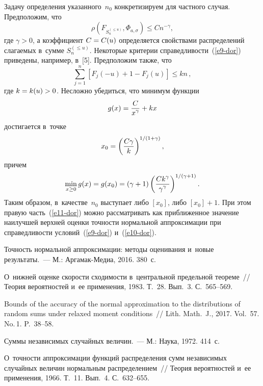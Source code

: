 \begin{multicols}{2}
Задачу определения указанного~$n_0$ конкретизируем для частного случая. Предположим, что
\begin{equation}
\rho\left(F_{S_n^{(\le u)}},\Phi_{a,\sigma}\right)\le C n^{-\gamma}, \label{e9-dor}
\end{equation}
где $\gamma>0$, а коэффициент $C\hm=C(u)$ определяется свойствами распределений слагаемых 
в~сумме $S_n^{(\le u)}$. Некоторые критерии справедливости~(\ref{e9-dor}) 
приведены, например, в~[5]. Предположим также, что
\begin{equation}
\sum\limits_{j=1}^n\left[F_j(-u)+1-F_j(u)\right]\le kn\,,
\label{e10-dor}\end{equation}
где $k=k(u)\hm>0$. Несложно убедиться, что минимум функции
$$
g(x)=\displaystyle\frac{\displaystyle C\mathstrut}{\displaystyle x^{\gamma}\mathstrut}+kx
$$
достигается в~точке
$$
x_0=\left(\displaystyle\frac{\displaystyle C\gamma\mathstrut}{\displaystyle k\mathstrut}\right)^{{1}/({1+\gamma})},
$$
причем
\begin{equation}
\min\limits_{x\ge0}g(x)=g(x_0)=
(\gamma+1)\left(\displaystyle\frac{\displaystyle Ck^{\gamma}\mathstrut}{\displaystyle \gamma^{\gamma}\mathstrut}\right)^{{1}/({\gamma+1})}.
\label{e11-dor}
\end{equation}
Таким образом, в~качестве~$n_0$ выступает либо $[x_0]$, либо $[x_0]+1$. 
При этом правую часть~(\ref{e11-dor}) можно рассматривать как приближенное значение наилучшей 
верхней оценки точности нормальной аппроксимации при справедливости условий~(\ref{e9-dor}) и~(\ref{e10-dor}).

{\small\frenchspacing
{%
\begin{thebibliography}{9}
 Точность нормальной аппроксимации: 
методы оценивания и~новые результаты.~--- М.: Аргамак-Медиа, 2016. 380~с.

 О~нижней оценке скорости сходимости в~центральной предельной теореме~// 
Теория вероятностей и~ее применения,
1983. Т.~28. Вып.~3. С.~565--569.

 Bounds of the accuracy of 
the normal approximation to the distributions of random sums under relaxed moment conditions~// 
Lith. Math.~J., 2017. Vol.~57. No.\,1. P.~38--58.

 Суммы независимых случайных величин.~--- М.: Наука, 1972. 414~с.


 О~точ\-ности аппроксимации функций распределения сумм 
независимых случайных величин нормальным распределением~// Теория вероятностей и~ее применения, 1966. 
Т.~11. Вып.~4. С.~632--655.
\end{thebibliography}

}
}

\end{multicols}

